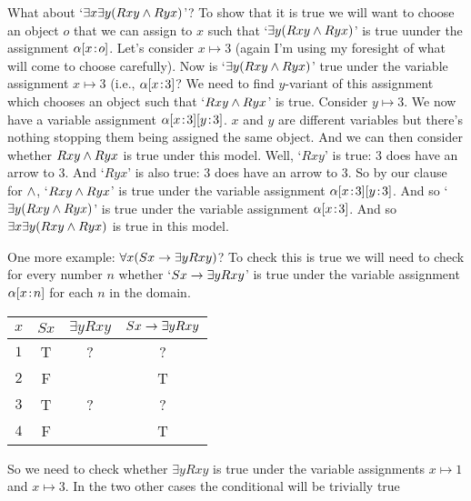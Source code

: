 What about `$\exists x \exists y(Rxy \mathbin{\wedge} Ryx)$'? To show that it is true we will want to choose an object $o$ that we can assign to $x$ such that `$\exists y (Rxy\mathbin{\wedge} Ryx)$' is true uunder the assignment $\alpha[x \!:\! o]$. Let's consider $x\mapsto 3$ (again I'm using my foresight of what will come to choose carefully). Now is `$\exists y (Rxy\mathbin{\wedge} Ryx)$'  true under the variable assignment $x\mapsto 3$ (i.e., $\alpha[x \!:\! 3]$? We need to find $y$-variant of this assignment which chooses an object such that `$Rxy\mathbin{\wedge} Ryx$' is true. Consider $y\mapsto 3$. We now have a variable assignment $\alpha[x \!:\! 3][y \!:\! 3]$. $x$ and $y$ are different variables but there's nothing stopping them being assigned the same object. And we can then consider whether $Rxy\mathbin{\wedge} Ryx$ is true under this model. Well, `$Rxy$' is true: 3 does have an arrow to 3. And `$Ryx$' is also true: 3 does have an arrow to 3. So by our clause for $\mathbin{\wedge}$, `$Rxy\mathbin{\wedge} Ryx$' is true under the variable assignment $\alpha[x \!:\! 3][y \!:\! 3]$. And so `$\exists y(Rxy\mathbin{\wedge} Ryx)$' is true under the variable assignment $\alpha[x \!:\! 3]$. And so $\exists x\exists y(Rxy\mathbin{\wedge} Ryx)$ is true in this model.

One more example: $\forall x(Sx\rightarrow \exists y Rxy)$? To check this is true we will need to check for every number $n$ whether `$Sx\rightarrow \exists y Rxy$' is true under the variable assignment $\alpha[x \!:\! n]$ for each $n$ in the domain. 
\begin{center}
\begin{tabular}{c|ccc}
$x$&$Sx$&$\exists y Rxy$&$Sx\rightarrow\exists y Rxy$\Bstrut\\\hline\Tstrut
$1$&T&?&?\\
$2$&F&&T\\
$3$&T&?&?\\
$4$&F&&T
\end{tabular}
\end{center}

So we need to check  whether $\exists y Rxy$ is true under the variable assignments $x\mapsto 1$ and $x\mapsto 3$. In the two other cases the conditional will be trivially true

